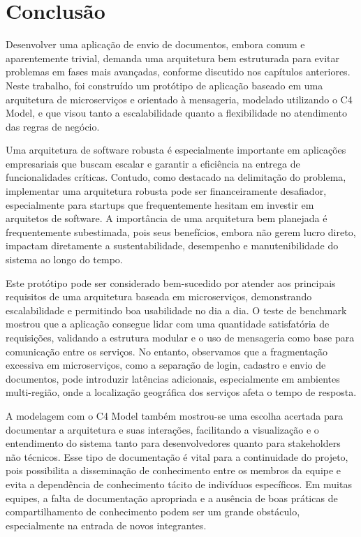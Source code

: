 \chapter{Conclusão}

Desenvolver uma aplicação de envio de documentos, embora comum e aparentemente trivial, demanda uma arquitetura bem estruturada para evitar problemas em fases mais avançadas, conforme discutido nos capítulos anteriores. Neste trabalho, foi construído um protótipo de aplicação baseado em uma arquitetura de microserviços e orientado à mensageria, modelado utilizando o C4 Model, e que visou tanto a escalabilidade quanto a flexibilidade no atendimento das regras de negócio.

Uma arquitetura de software robusta é especialmente importante em aplicações empresariais que buscam escalar e garantir a eficiência na entrega de funcionalidades críticas. Contudo, como destacado na delimitação do problema, implementar uma arquitetura robusta pode ser financeiramente desafiador, especialmente para startups que frequentemente hesitam em investir em arquitetos de software. A importância de uma arquitetura bem planejada é frequentemente subestimada, pois seus benefícios, embora não gerem lucro direto, impactam diretamente a sustentabilidade, desempenho e manutenibilidade do sistema ao longo do tempo.

Este protótipo pode ser considerado bem-sucedido por atender aos principais requisitos de uma arquitetura baseada em microserviços, demonstrando escalabilidade e permitindo boa usabilidade no dia a dia. O teste de benchmark mostrou que a aplicação consegue lidar com uma quantidade satisfatória de requisições, validando a estrutura modular e o uso de mensageria como base para comunicação entre os serviços. No entanto, observamos que a fragmentação excessiva em microserviços, como a separação de login, cadastro e envio de documentos, pode introduzir latências adicionais, especialmente em ambientes multi-região, onde a localização geográfica dos serviços afeta o tempo de resposta.

A modelagem com o C4 Model também mostrou-se uma escolha acertada para documentar a arquitetura e suas interações, facilitando a visualização e o entendimento do sistema tanto para desenvolvedores quanto para stakeholders não técnicos. Esse tipo de documentação é vital para a continuidade do projeto, pois possibilita a disseminação de conhecimento entre os membros da equipe e evita a dependência de conhecimento tácito de indivíduos específicos. Em muitas equipes, a falta de documentação apropriada e a ausência de boas práticas de compartilhamento de conhecimento podem ser um grande obstáculo, especialmente na entrada de novos integrantes.

